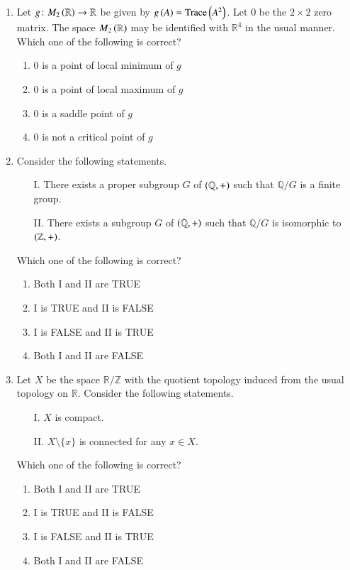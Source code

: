 \documentclass[journal,12pt,onecolumn]{IEEEtran}
\theoremstyle{remark}
\begin{document}
\begin{enumerate}
\item Let $g \colon M_2\left(\mathbb{R}\right) \to \mathbb{R}$ be given by $g\left(A\right) = \text{Trace}\left(A^2\right)$. Let $0$ be the $2 \times 2$ zero matrix. The space $M_2\left(\mathbb{R}\right)$ may be identified with $\mathbb{R}^4$ in the usual manner. Which one of the following is correct? \hfill{}
\begin{enumerate}
    \item $0$ is a point of local minimum of $g$
    \item $0$ is a point of local maximum of $g$
    \item $0$ is a saddle point of $g$
    \item $0$ is not a critical point of $g$
\end{enumerate}

\item Consider the following statements.
\begin{enumerate}
    \item[I.] There exists a proper subgroup $G$ of $\left(\mathbb{Q}, +\right)$ such that $\mathbb{Q}/G$ is a finite group.
    \item[II.] There exists a subgroup $G$ of $\left(\mathbb{Q}, +\right)$ such that $\mathbb{Q}/G$ is isomorphic to $\left(\mathbb{Z}, +\right)$.
\end{enumerate}
Which one of the following is correct? \hfill{}
\begin{enumerate}
    \item Both I and II are TRUE
    \item I is TRUE and II is FALSE
    \item I is FALSE and II is TRUE
    \item Both I and II are FALSE
\end{enumerate}

\item Let $X$ be the space $\mathbb{R}/\mathbb{Z}$ with the quotient topology induced from the usual topology on $\mathbb{R}$. Consider the following statements.
\begin{enumerate}
    \item[I.] $X$ is compact.
    \item[II.] $X \setminus \{x\}$ is connected for any $x \in X$.
\end{enumerate}
Which one of the following is correct? \hfill{}
\begin{enumerate}
    \item Both I and II are TRUE
    \item I is TRUE and II is FALSE
    \item I is FALSE and II is TRUE
    \item Both I and II are FALSE
\end{enumerate}


\end{enumerate}
\end{document}
